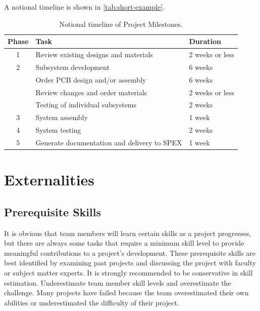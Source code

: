 \documentclass[conference]{IEEEtran} %
\begin{document}
A notional timeline is shown in \autoref{tab:short-example}.

\begin{table}[hb!]
    \caption{Notional timeline of Project Milestones.}
    \centering
    \begin{tabular}{@{}cll@{}}
    \toprule
    Phase & Task & Duration \\
    \midrule
    1 & Review existing designs and materials & 2 weeks or less\\
    2 & Subsystem development & 6 weeks \\
      & Order PCB design and/or assembly & 6 weeks \\
      & Review changes and order materials & 2 weeks or less\\
      & Testing of individual subsystems & 2 weeks \\
    3 & System assembly & 1 week  \\
    4 & System testing & 2 weeks  \\
    5 & Generate documentation and delivery to SPEX & 1 week  \\
    \bottomrule
    \end{tabular}
\label{tab:short-example}
\end{table}

\section{Externalities}
\subsection{Prerequisite Skills}
It is obvious that team members will learn certain skills as a project progresses, but there are always some tasks that require a minimum skill level to provide meaningful contributions to a project's development.
These prerequisite skills are best identified by examining past projects and discussing the project with faculty or subject matter experts.
It is strongly recommended to be conservative in skill estimation.
Underestimate team member skill levels and overestimate the challenge.
Many projects have failed because the team overestimated their own abilities or underestimated the difficulty of their project.
\end{document}
